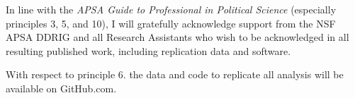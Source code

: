 \documentclass[
      12pt,
        ]{article}
\begin{document}
In line with the \emph{APSA Guide to Professional in Political Science} (especially principles 3, 5, and 10), I will gratefully acknowledge support from the NSF APSA DDRIG and all Research Assistants who wish to be acknowledged in all resulting published work, including replication data and software.

With respect to principle 6. the data and code to replicate all analysis will be available on GitHub.com.

\newpage
\newpage
\singlespacing 
           
   
\end{document}

